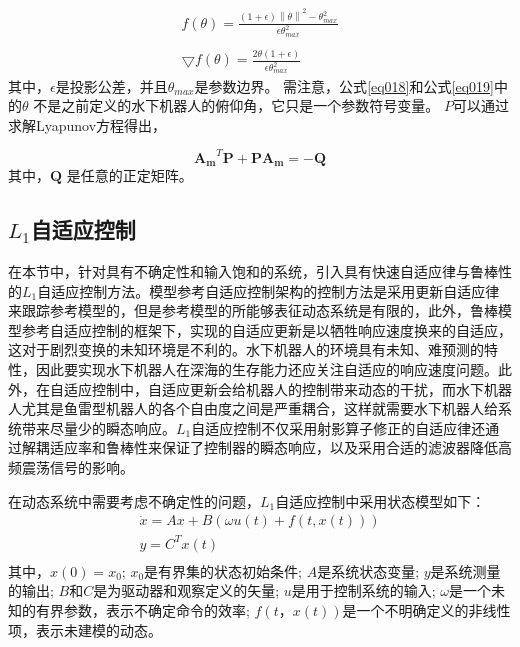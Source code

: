 \begin{equation}
\label{eq019}
\begin{array}{l}
f(\theta)={}\frac{\left ( 1+ \epsilon  \right )\left \| \theta  \right \|^2 - \theta _{max}^2}{\epsilon \theta_{max}^2}\\
\\
\bigtriangledown f(\theta)={}\frac{2 \theta(1+\epsilon )}{\epsilon \theta _{max}^2}
\end{array}
\end{equation}
其中，$\epsilon$是投影公差，并且$\theta_{max}$是参数边界。 需注意，公式\ref {eq018}和公式\ref {eq019}中的$\theta$ 不是之前定义的水下机器人的俯仰角，它只是一个参数符号变量。 $P$可以通过求解Lyapunov方程得出，

\begin{equation}
\bm{A_m}^T \bm{P} + \bm{P} \bm{A_m} = -\bm{Q}
\end{equation}
其中，$\bm{Q}$ 是任意的正定矩阵。


\subsection{$L_{1}$自适应控制 }


在本节中，针对具有不确定性和输入饱和的系统，引入具有快速自适应律与鲁棒性的$L_1$自适应控制方法。模型参考自适应控制架构的控制方法是采用更新自适应律来跟踪参考模型的，但是参考模型的所能够表征动态系统是有限的，此外，鲁棒模型参考自适应控制的框架下，实现的自适应更新是以牺牲响应速度换来的自适应，这对于剧烈变换的未知环境是不利的。水下机器人的环境具有未知、难预测的特性，因此要实现水下机器人在深海的生存能力还应关注自适应的响应速度问题。此外，在自适应控制中，自适应更新会给机器人的控制带来动态的干扰，而水下机器人尤其是鱼雷型机器人的各个自由度之间是严重耦合，这样就需要水下机器人给系统带来尽量少的瞬态响应。$L_1$自适应控制不仅采用射影算子修正的自适应律还通过解耦适应率和鲁棒性来保证了控制器的瞬态响应，以及采用合适的滤波器降低高频震荡信号的影响\cite{maalouf2013contribution}。

在动态系统中需要考虑不确定性的问题，$L_1$自适应控制中采用状态模型如下：
\begin{equation}
\begin{array}{l}
 \dot x = Ax + B(\omega u(t) + f(t,x(t))) \\
 y = {C^T}x(t) \\
 \end{array}
\end{equation}
其中，$x(0)= x_0$; $ x_0 $是有界集的状态初始条件; $ A $是系统状态变量; $y$是系统测量的输出; $B$和$C$是为驱动器和观察定义的矢量; $u$是用于控制系统的输入; $\omega$是一个未知的有界参数，表示不确定命令的效率; $f(t，x(t))$是一个不明确定义的非线性项，表示未建模的动态。

